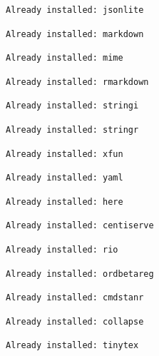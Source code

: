 \documentclass[
  12,
  letterpaper,
  DIV=11,
  numbers=noendperiod]{scrartcl}
\begin{document}
\begin{verbatim}
Already installed: jsonlite
\end{verbatim}

\begin{verbatim}
Already installed: markdown
\end{verbatim}

\begin{verbatim}
Already installed: mime
\end{verbatim}

\begin{verbatim}
Already installed: rmarkdown
\end{verbatim}

\begin{verbatim}
Already installed: stringi
\end{verbatim}

\begin{verbatim}
Already installed: stringr
\end{verbatim}

\begin{verbatim}
Already installed: xfun
\end{verbatim}

\begin{verbatim}
Already installed: yaml
\end{verbatim}

\begin{verbatim}
Already installed: here
\end{verbatim}

\begin{verbatim}
Already installed: centiserve
\end{verbatim}

\begin{verbatim}
Already installed: rio
\end{verbatim}

\begin{verbatim}
Already installed: ordbetareg
\end{verbatim}

\begin{verbatim}
Already installed: cmdstanr
\end{verbatim}

\begin{verbatim}
Already installed: collapse
\end{verbatim}

\begin{verbatim}
Already installed: tinytex
\end{verbatim}
\end{document}
